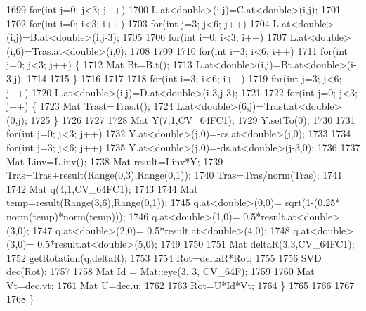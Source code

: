 \begin{DoxyCode}
1699             \textcolor{keywordflow}{for}(\textcolor{keywordtype}{int} j=0; j<3; j++)
1700                 L.at<\textcolor{keywordtype}{double}>(i,j)=C.at<\textcolor{keywordtype}{double}>(i,j);
1701 
1702         \textcolor{keywordflow}{for}(\textcolor{keywordtype}{int} i=0; i<3; i++)
1703             \textcolor{keywordflow}{for}(\textcolor{keywordtype}{int} j=3; j<6; j++)
1704                 L.at<\textcolor{keywordtype}{double}>(i,j)=B.at<\textcolor{keywordtype}{double}>(i,j-3);
1705     
1706         \textcolor{keywordflow}{for}(\textcolor{keywordtype}{int} i=0; i<3; i++)
1707                 L.at<\textcolor{keywordtype}{double}>(i,6)=Tras.at<\textcolor{keywordtype}{double}>(i,0);
1708 
1709 
1710         \textcolor{keywordflow}{for}(\textcolor{keywordtype}{int} i=3; i<6; i++)
1711             \textcolor{keywordflow}{for}(\textcolor{keywordtype}{int} j=0; j<3; j++) \{
1712                 Mat Bt=B.t();
1713                 L.at<\textcolor{keywordtype}{double}>(i,j)=Bt.at<\textcolor{keywordtype}{double}>(i-3,j);
1714 
1715             \}
1716 
1717 
1718         \textcolor{keywordflow}{for}(\textcolor{keywordtype}{int} i=3; i<6; i++)
1719             \textcolor{keywordflow}{for}(\textcolor{keywordtype}{int} j=3; j<6; j++)
1720                 L.at<\textcolor{keywordtype}{double}>(i,j)=D.at<\textcolor{keywordtype}{double}>(i-3,j-3);
1721 
1722         \textcolor{keywordflow}{for}(\textcolor{keywordtype}{int} j=0; j<3; j++) \{
1723                 Mat Trast=Tras.t();
1724                 L.at<\textcolor{keywordtype}{double}>(6,j)=Trast.at<\textcolor{keywordtype}{double}>(0,j);
1725         \}
1726 
1727 
1728         Mat Y(7,1,CV\_64FC1);
1729         Y.setTo(0);
1730 
1731         \textcolor{keywordflow}{for}(\textcolor{keywordtype}{int} j=0; j<3; j++)
1732                 Y.at<\textcolor{keywordtype}{double}>(j,0)=-cs.at<\textcolor{keywordtype}{double}>(j,0);
1733 
1734         \textcolor{keywordflow}{for}(\textcolor{keywordtype}{int} j=3; j<6; j++)
1735                 Y.at<\textcolor{keywordtype}{double}>(j,0)=-ds.at<\textcolor{keywordtype}{double}>(j-3,0);
1736 
1737         Mat Linv=L.inv();
1738         Mat result=Linv*Y;
1739         Tras=Tras+result(Range(0,3),Range(0,1));
1740         Tras=Tras/norm(Tras);
1741 
1742         Mat q(4,1,CV\_64FC1);
1743 
1744         Mat temp=result(Range(3,6),Range(0,1));       
1745         q.at<\textcolor{keywordtype}{double}>(0,0)= sqrt(1-(0.25* norm(temp)*norm(temp)));
1746         q.at<\textcolor{keywordtype}{double}>(1,0)= 0.5*result.at<\textcolor{keywordtype}{double}>(3,0);
1747         q.at<\textcolor{keywordtype}{double}>(2,0)= 0.5*result.at<\textcolor{keywordtype}{double}>(4,0);
1748         q.at<\textcolor{keywordtype}{double}>(3,0)= 0.5*result.at<\textcolor{keywordtype}{double}>(5,0);
1749 
1750 
1751         Mat deltaR(3,3,CV\_64FC1);
1752         getRotation(q,deltaR);
1753 
1754         Rot=deltaR*Rot;
1755 
1756         SVD dec(Rot);
1757 
1758         Mat Id = Mat::eye(3, 3, CV\_64F);
1759 
1760         Mat Vt=dec.vt;
1761         Mat U=dec.u;
1762 
1763         Rot=U*Id*Vt;
1764     \}
1765 
1766 
1767 
1768 \}
\end{DoxyCode}
